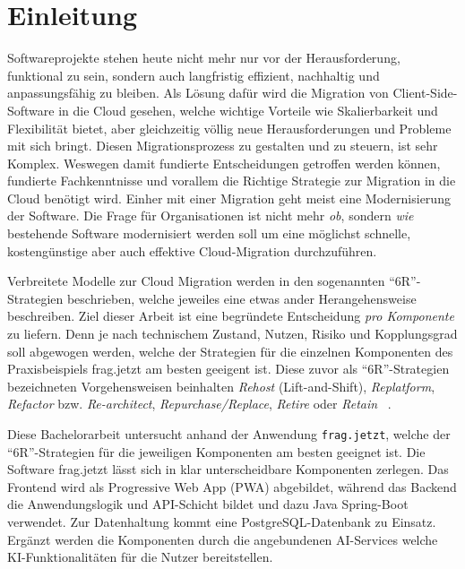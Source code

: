 
\setlength{\emergencystretch}{2em}

\section{Einleitung}

Softwareprojekte stehen heute nicht mehr nur vor der Herausforderung, funktional zu sein, sondern auch langfristig effizient, nachhaltig und anpassungsfähig zu bleiben.
Als Lösung dafür wird die Migration von Client-Side-Software in die Cloud gesehen, welche wichtige Vorteile wie Skalierbarkeit und Flexibilität bietet, aber gleichzeitig
völlig neue Herausforderungen und Probleme mit sich bringt. Diesen Migrationsprozess zu gestalten und zu steuern, ist sehr Komplex. Weswegen damit fundierte Entscheidungen 
getroffen werden können, fundierte Fachkenntnisse und vorallem die Richtige Strategie zur Migration in die Cloud benötigt wird. Einher mit einer Migration geht meist eine Modernisierung der Software.
Die Frage für Organisationen ist nicht mehr \emph{ob}, sondern \emph{wie} bestehende Software modernisiert werden soll um eine möglichst schnelle,
kostengünstige aber auch effektive Cloud-Migration durchzuführen.

Verbreitete Modelle zur Cloud Migration werden in den sogenannten \enquote{6R}-Strategien beschrieben, welche jeweiles eine etwas ander Herangehensweise beschreiben.
Ziel dieser Arbeit ist eine begründete Entscheidung \emph{pro Komponente} zu liefern. Denn je nach technischem Zustand, Nutzen, Risiko und Kopplungsgrad soll abgewogen werden, 
welche der Strategien für die einzelnen Komponenten des Praxisbeispiels frag.jetzt am besten geeigent ist. Diese zuvor als \enquote{6R}-Strategien bezeichneten Vorgehensweisen 
beinhalten \emph{Rehost} (Lift-and-Shift), \emph{Replatform}, \emph{Refactor} bzw. \emph{Re-architect}, \emph{Repurchase/Replace}, \emph{Retire} oder \emph{Retain} ~\cite{aws2023sixRs}.

Diese Bachelorarbeit untersucht anhand der Anwendung \texttt{frag.jetzt}, welche der \enquote{6R}-Strategien für die jeweiligen Komponenten am besten geeignet ist. 
Die Software frag.jetzt lässt sich in klar unterscheidbare Komponenten zerlegen. Das Frontend wird als Progressive Web App (PWA) abgebildet, 
während das Backend die Anwendungslogik und API-Schicht bildet und dazu Java Spring-Boot verwendet. 
Zur Datenhaltung kommt eine PostgreSQL-Datenbank zu Einsatz. Ergänzt werden die Komponenten durch die angebundenen AI-Services welche KI-Funktionalitäten für die Nutzer bereitstellen.

